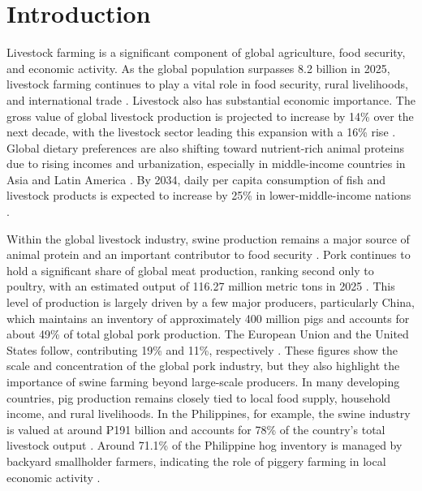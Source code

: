 \section{Introduction}

Livestock farming is a significant component of global agriculture, food security, and economic activity. As the global population surpasses 8.2 billion in 2025, livestock farming continues to play a vital role in food security, rural livelihoods, and international trade \cite{piyush2025animal}\cite{livestockproduction2026}. Livestock also has substantial economic importance. The gross value of global livestock production is projected to increase by 14\% over the next decade, with the livestock sector leading this expansion with a 16\% rise \cite{oecdfao2025outlook}. Global dietary preferences are also shifting toward nutrient-rich animal proteins due to rising incomes and urbanization, especially in middle-income countries in Asia and Latin America \cite{livestockproduction2026}\cite{oecdfao2025outlook}. By 2034, daily per capita consumption of fish and livestock products is expected to increase by 25\% in lower-middle-income nations \cite{oecdfao2025outlook}\cite{livestockproduction2026}.

Within the global livestock industry, swine production remains a major source of animal protein and an important contributor to food security \cite{livestockproduction2026}. Pork continues to hold a significant share of global meat production, ranking second only to poultry, with an estimated output of 116.27 million metric tons in 2025 \cite{usda2026pork}. This level of production is largely driven by a few major producers, particularly China, which maintains an inventory of approximately 400 million pigs and accounts for about 49\% of total global pork production. The European Union and the United States follow, contributing 19\% and 11\%, respectively \cite{usda2026pork}. These figures show the scale and concentration of the global pork industry, but they also highlight the importance of swine farming beyond large-scale producers. In many developing countries, pig production remains closely tied to local food supply, household income, and rural livelihoods. In the Philippines, for example, the swine industry is valued at around ₱191 billion and accounts for 78\% of the country's total livestock output \cite{livestockproduction2026}\cite{porcinews2026philippine}\cite{lo2025rebooting}\cite{villanueva2025philippine}. Around 71.1\% of the Philippine hog inventory is managed by backyard smallholder farmers, indicating the role of piggery farming in local economic activity \cite{lo2025rebooting}.

